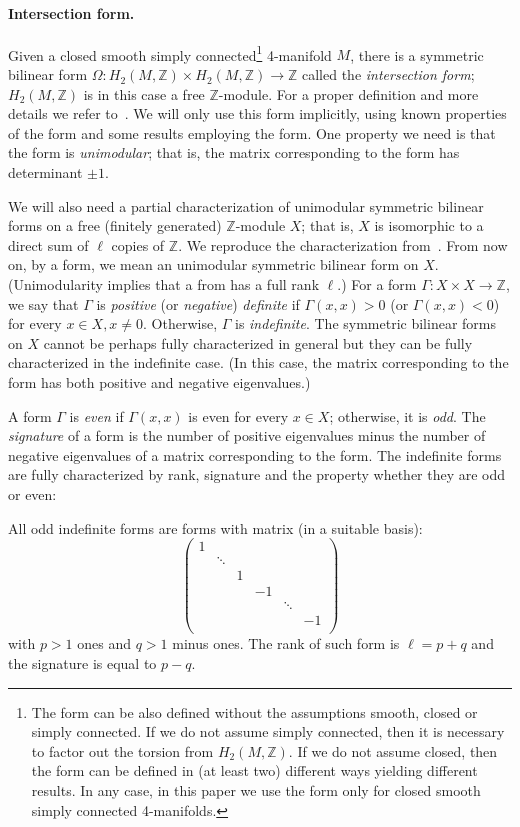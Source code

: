 \documentclass[10pt,a4paper]{article}
\theoremstyle{definition}
\theoremstyle{remark}
\newcommand{\Z}{{\mathbb{Z}}}
\begin{document}
\paragraph{Intersection form.} Given a closed smooth simply
connected\footnote{The form can be also defined
without the assumptions smooth, closed or simply connected. If we do not assume
simply connected, then it is necessary to factor out the torsion from $H_2(M,
\Z)$. If we do not assume closed, then the form can be defined in (at least
two) different ways yielding different results. In any case, in this paper we
use the form only for closed smooth simply 
connected 4-manifolds.} 4-manifold $M$,
there is a symmetric bilinear form $\Omega \colon H_2(M, \Z) \times H_2(M, \Z) \to \Z$
called the \emph{intersection form}; $H_2(M, \Z)$ is in this case a free
$\Z$-module. For a proper definition and more details
we refer to~\cite{kirby89}. We will only use this form implicitly, using known properties
of the form and some results employing the form. One property we need is
that the form is \emph{unimodular}; that is, the matrix corresponding to the
form has determinant $\pm 1$. 

We will also need a partial characterization of unimodular symmetric bilinear
forms on a free (finitely generated) $\Z$-module $X$; that is, $X$ is
isomorphic to a direct sum of $\ell$ copies of $\Z$. We reproduce the
characterization from~\cite{kirby89}.
From now on, by a form, we
mean an unimodular symmetric bilinear form on $X$. (Unimodularity implies that a
from has a full rank $\ell$.) For a form $\Gamma \colon X \times X \to \Z$, we
say that $\Gamma$ is \emph{positive} (or \emph{negative}) \emph{definite} if $\Gamma(x,x) > 0$ (or
$\Gamma(x,x) < 0$) for every $x \in X, x \neq 0$. Otherwise, $\Gamma$ is
\emph{indefinite}.
The symmetric bilinear forms on $X$ cannot be perhaps fully characterized in
general but they can be fully characterized in the indefinite case. (In this
case, the matrix corresponding to the form has both positive and negative
eigenvalues.) 

A form $\Gamma$ is \emph{even} if $\Gamma(x,x)$ is even for every $x \in X$;
otherwise, it is \emph{odd}. The \emph{signature} of a form is the number of
positive eigenvalues minus the number of negative eigenvalues of a matrix
corresponding to the form. The indefinite forms are fully characterized by
rank, signature and the property whether they are odd or even:

All odd indefinite forms are forms with matrix (in a suitable basis):
\[
  \begin{pmatrix}
    1 & & & & & \\
    & \ddots & & & & \\
    & & 1 & & & \\
    & & & - 1 & & \\
    & & & & \ddots & \\
    & & & & & -1\\
\end{pmatrix}
\]
with $p > 1$ ones and $q > 1$ minus ones. The rank of such form is $\ell = p+q$
and the signature is equal to $p-q$.
\end{document}
